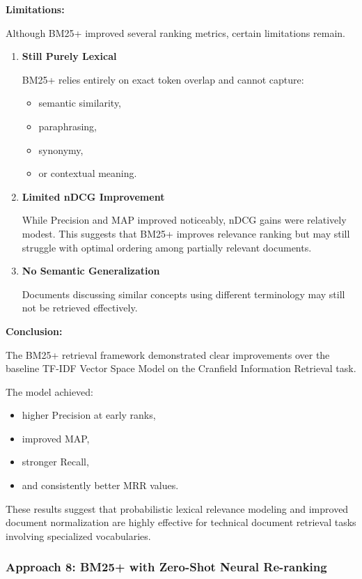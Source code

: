\documentclass{article}
\begin{document}
\textbf{Limitations:}

Although BM25+ improved several ranking metrics, certain limitations remain.

\begin{enumerate}
    \item \textbf{Still Purely Lexical}

    BM25+ relies entirely on exact token overlap and cannot capture:
    \begin{itemize}
        \item semantic similarity,
        \item paraphrasing,
        \item synonymy,
        \item or contextual meaning.
    \end{itemize}

    \item \textbf{Limited nDCG Improvement}

    While Precision and MAP improved noticeably, nDCG gains were relatively modest. This suggests that BM25+ improves relevance ranking but may still struggle with optimal ordering among partially relevant documents.

    \item \textbf{No Semantic Generalization}

    Documents discussing similar concepts using different terminology may still not be retrieved effectively.
\end{enumerate}

\textbf{Conclusion:}

The BM25+ retrieval framework demonstrated clear improvements over the baseline TF-IDF Vector Space Model on the Cranfield Information Retrieval task.

The model achieved:
\begin{itemize}
    \item higher Precision at early ranks,
    \item improved MAP,
    \item stronger Recall,
    \item and consistently better MRR values.
\end{itemize}

These results suggest that probabilistic lexical relevance modeling and improved document normalization are highly effective for technical document retrieval tasks involving specialized vocabularies.

\subsubsection{Approach 8: BM25+ with Zero-Shot Neural Re-ranking}
\end{document}
